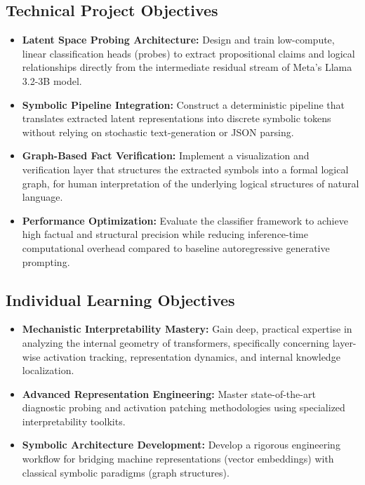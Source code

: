 \documentclass[12 pt]{article}  %
\begin{document}
\subsection{Technical Project Objectives}
\begin{itemize}
    \item \textbf{Latent Space Probing Architecture:} Design and train 
    low-compute, linear classification heads (probes) to extract propositional 
    claims and logical relationships directly from the intermediate residual 
    stream of Meta's Llama 3.2-3B model.
    \item \textbf{Symbolic Pipeline Integration:} Construct a deterministic 
    pipeline that translates extracted latent representations into discrete 
    symbolic tokens without relying on stochastic text-generation or JSON 
    parsing.
    \item \textbf{Graph-Based Fact Verification:} Implement a visualization and 
    verification layer that structures the extracted symbols into a formal 
    logical graph, for human interpretation of the underlying logical 
    structures of natural language.
    \item \textbf{Performance Optimization:} Evaluate the classifier framework 
    to achieve high factual and structural precision while reducing 
    inference-time computational overhead compared to baseline autoregressive 
    generative prompting.
\end{itemize}

\subsection{Individual Learning Objectives}
\begin{itemize}
    \item \textbf{Mechanistic Interpretability Mastery:} Gain deep, practical 
    expertise in analyzing the internal geometry of transformers, specifically 
    concerning layer-wise activation tracking, representation dynamics, and 
    internal knowledge localization.
    \item \textbf{Advanced Representation Engineering:} Master state-of-the-art 
    diagnostic probing and activation patching methodologies using specialized 
    interpretability toolkits.
    \item \textbf{Symbolic Architecture Development:} Develop a rigorous 
    engineering workflow for bridging machine representations (vector 
    embeddings) with classical symbolic paradigms (graph structures).
\end{itemize}
\end{document}
